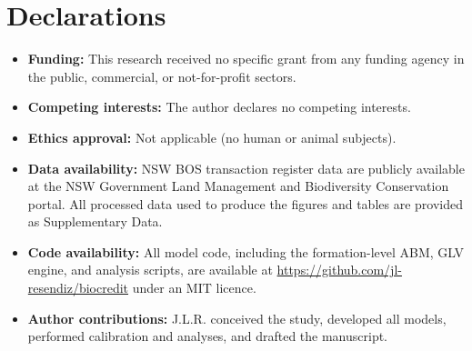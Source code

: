 \documentclass[pdflatex,sn-nature,oneside]{sn-jnl}
\begin{document}

\backmatter

\section*{Declarations}

\begin{itemize}
  \item \textbf{Funding:} This research received no specific grant from any funding agency in the public, commercial, or not-for-profit sectors.
  \item \textbf{Competing interests:} The author declares no competing interests.
  \item \textbf{Ethics approval:} Not applicable (no human or animal subjects).
  \item \textbf{Data availability:}
    NSW BOS transaction register data are publicly available at the NSW Government
    Land Management and Biodiversity Conservation portal.
    All processed data used to produce the figures and tables are provided
    as Supplementary Data.
  \item \textbf{Code availability:}
    All model code, including the formation-level ABM, GLV engine,
    and analysis scripts,
    are available at \url{https://github.com/jl-resendiz/biocredit} under an MIT licence.
  \item \textbf{Author contributions:}
    J.L.R. conceived the study, developed all models, performed calibration and
    analyses, and drafted the manuscript.
\end{itemize}


\end{document}
